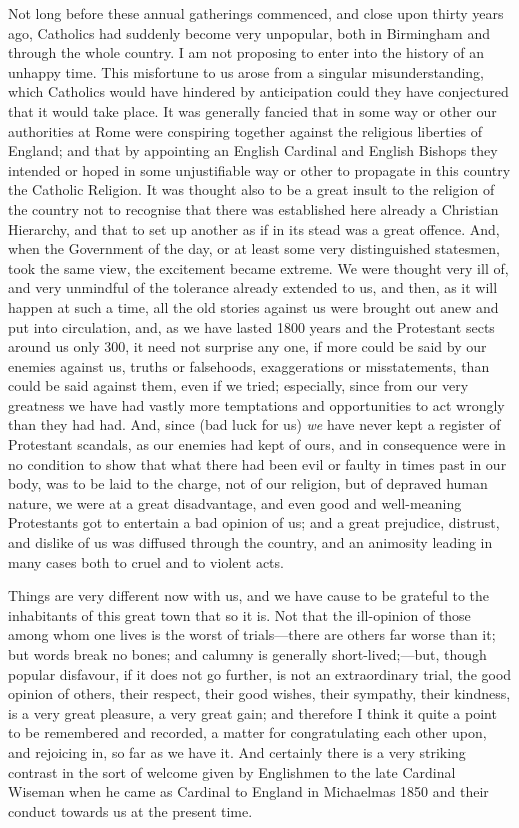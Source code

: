 Not long before these annual gatherings commenced, and close upon
thirty years ago, Catholics had suddenly become very unpopular, both
in Birmingham and through the whole country. I am not proposing to
enter into the history of an unhappy time. This misfortune to us arose
from a singular misunderstanding, which Catholics would have hindered
by anticipation could they have conjectured that it would take place.
It was generally fancied that in some way or other our authorities at
Rome were conspiring together against the religious liberties of
England; and that by appointing an English Cardinal and English
Bishops they intended or hoped in some unjustifiable way or other to
propagate in this country the Catholic Religion. It was thought also
to be a great insult to the religion of the country not to recognise
that there was established here already a Christian Hierarchy, and
that to set up another as if in its stead was a great offence. And,
when the Government of the day, or at least some very distinguished
statesmen, took the same view, the excitement became extreme. We were
thought very ill of, and very unmindful of the tolerance already
extended to us, and then, as it will happen at such a time, all the
old stories against us were brought out anew and put into circulation,
and, as we have lasted 1800 years and the Protestant sects around us
only 300, it need not surprise any one, if more could be said by our
enemies against us, truths or falsehoods, exaggerations or
misstatements, than could be said against them, even if we tried;
especially, since from our very greatness we have had vastly more
temptations and opportunities to act wrongly than they had had. And,
since (bad luck for us) \emph{we} have never kept a register of
Protestant scandals, as our enemies had kept of ours, and in
consequence were in no condition to show that what there had been evil
or faulty in times past in our body, was to be laid to the charge, not
of our religion, but of depraved human nature, we were at a great
disadvantage, and even good and well-meaning Protestants got to
entertain a bad opinion of us; and a great prejudice, distrust, and
dislike of us was diffused through the country, and an animosity
leading in many cases both to cruel and to violent acts.

Things are very different now with us, and we have cause to be
grateful to the inhabitants of this great town that so it is. Not that
the ill-opinion of those among whom one lives is the worst of trials—there
are others far worse than it; but words break no bones; and calumny is
generally short-lived;—but, though popular disfavour, if it does not
go further, is not an extraordinary trial, the good opinion of others,
their respect, their good wishes, their sympathy, their kindness, is a
very great pleasure, a very great gain; and therefore I think it quite
a point to be remembered and recorded, a matter for congratulating
each other upon, and rejoicing in, so far as we have it. And certainly
there is a very striking contrast in the sort of welcome given by
Englishmen to the late Cardinal Wiseman when he came as Cardinal to
England in Michaelmas 1850 and their conduct towards us at the present
time.

